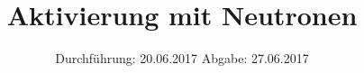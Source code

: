 

\subject{V702}
\title{Aktivierung mit Neutronen}
\date{
\centering
  Durchführung: 20.06.2017
  \hspace{3em}
  Abgabe: 27.06.2017
}



\maketitle
\thispagestyle{empty}
\tableofcontents
\newpage



%




\printbibliography


